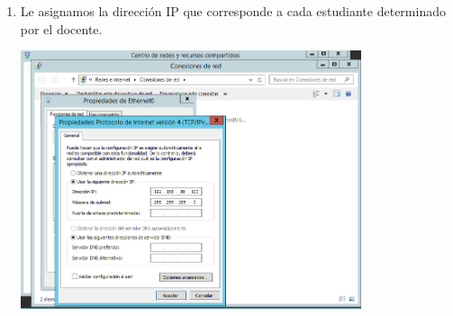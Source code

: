 \begin{enumerate}[1.]
	\item Le asignamos la dirección IP que corresponde a cada estudiante determinado por el docente.

	\begin{center}
	\includegraphics[width=10cm]{./Imagenes/img11server} 
	\end{center}


								

	

\end{enumerate} 
